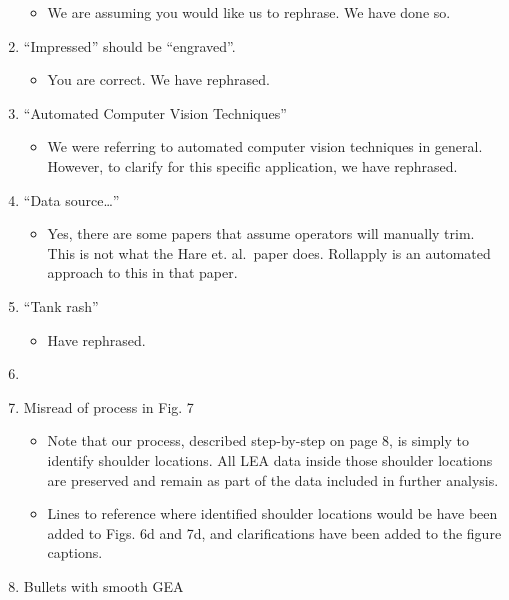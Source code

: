 \documentclass[12pt]{article}
\providecommand{\tightlist}{%
  \setlength{\itemsep}{0pt}\setlength{\parskip}{0pt}}
\begin{document}
\begin{enumerate}
  \begin{itemize}
  \tightlist
  \item
    We are assuming you would like us to rephrase. We have done so.
  \end{itemize}
\item
  ``Impressed'' should be ``engraved''.

  \begin{itemize}
  \tightlist
  \item
    You are correct. We have rephrased.
  \end{itemize}
\item
  ``Automated Computer Vision Techniques''

  \begin{itemize}
  \tightlist
  \item
    We were referring to automated computer vision techniques in
    general. However, to clarify for this specific application, we have
    rephrased.
  \end{itemize}
\item
  ``Data source\ldots{}''

  \begin{itemize}
  \tightlist
  \item
    Yes, there are some papers that assume operators will manually trim.
    This is not what the Hare et. al.~paper does. Rollapply is an
    automated approach to this in that paper.
  \end{itemize}
\item
  ``Tank rash''

  \begin{itemize}
  \tightlist
  \item
    Have rephrased.\\
  \end{itemize}
\item
\item
  Misread of process in Fig. 7

  \begin{itemize}
  \tightlist
  \item
    Note that our process, described step-by-step on page 8, is simply
    to identify shoulder locations. All LEA data inside those shoulder
    locations are preserved and remain as part of the data included in
    further analysis.
  \item
    Lines to reference where identified shoulder locations would be have
    been added to Figs. 6d and 7d, and clarifications have been added to
    the figure captions.
  \end{itemize}
\item
  Bullets with smooth GEA


\end{enumerate}
\end{document}
